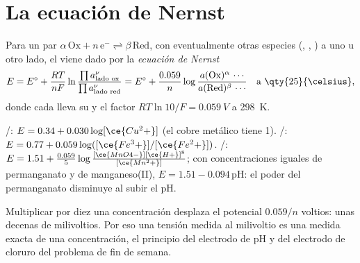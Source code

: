 \section{La ecuación de Nernst}

\begin{theorem}\label{thm:b1:nernst:nernst}
Para un par $\alpha\,\mathrm{Ox} + n\,\mathrm{e^-} \rightleftharpoons
\beta\,\mathrm{Red}$, con eventualmente otras especies (, ,
) a uno u otro lado, el  viene dado por la
\emph{ecuación de Nernst}
\[
  E = E^\circ + \frac{RT}{nF}\ln\frac{\prod a_{\text{lado ox}}^{\nu}}{\prod
  a_{\text{lado red}}^{\nu}}
  = E^\circ + \frac{0.059}{n}\log\frac{a(\mathrm{Ox})^\alpha\,\cdots}{a(\mathrm{Red})^\beta\,\cdots}
  \quad\text{a \qty{25}{\celsius}},
\]
donde cada  lleva su  y el factor
$RT\ln 10/F = \qty{0.059}{V}$ a \qty{298}{K}.
\end{theorem}


\begin{example}\label{ex:b1:nernst:examples}
/: $E = 0.34 + 0.030\log[\ce{Cu^2+}]$ (el cobre metálico
tiene  1).
/: $E = 0.77 + 0.059\log([\ce{Fe^3+}]/[\ce{Fe^2+}])$.
/: $E = 1.51 + \frac{0.059}{5}\log
\frac{[\ce{MnO4-}][\ce{H+}]^8}{[\ce{Mn^2+}]}$; con concentraciones iguales
de permanganato y de manganeso(II), $E = 1.51 - 0.094\,\mathrm{pH}$: el
poder  del permanganato disminuye al subir el pH.
\end{example}

Multiplicar por diez una concentración desplaza el potencial $0.059/n$
voltios: unas decenas de milivoltios. Por eso una tensión medida al
milivoltio es una medida exacta de una concentración, el principio del
electrodo de pH y del electrodo de cloruro del problema de fin de semana.

